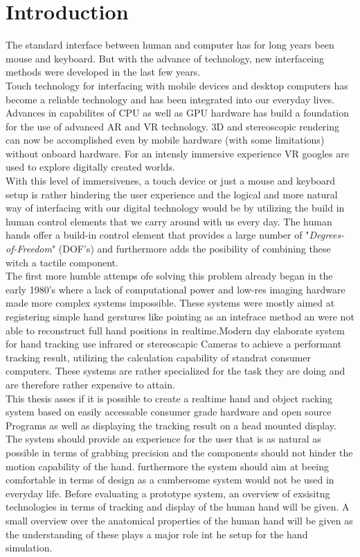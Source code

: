 \chapter{Introduction}
The standard interface between human and computer has for long years been mouse and keyboard. But with the advance of technology, new interfaceing methods were developed in the last few years.\\
Touch technology for interfacing with mobile devices and desktop computers has become a reliable technology and has been integrated into our everyday lives.
Advances in capabilites of CPU as well as GPU hardware has build a foundation for the use of advanced AR and VR technology. 3D and stereoscopic rendering can now be accomplished even by mobile hardware (with some limitations) without onboard hardware. For an intensly immersive experience VR googles are used to explore digitally created worlds.\\
With this level of immersivenes, a touch device or just a mouse and keyboard setup is rather hindering the user experience and the logical and more natural way of interfacing with our digital technology would be by utilizing the build in human control elements that we carry around with us every day. The human hands offer a build-in control element that provides a large number of "\textit{Degrees-of-Freedom}" (DOF's) and furthermore adds the posibility of combining these witch a tactile component.\\The first more humble attemps ofe solving this problem already began in the early 1980's where a lack of computational power and low-res imaging hardware made more complex systems impossible. These systems were mostly aimed at registering simple hand gerstures like pointing as an intefrace method an were not able to reconstruct full hand positions in realtime\cite{Bolt.1980}.Modern day elaborate system for hand tracking use infrared or stereoscapic Cameras to achieve a performant tracking result, utilizing the calculation capability of standrat consumer computers. These systems are rather specialized for the task they are doing and are therefore rather expensive to attain. \\
This thesis asses if it is possible to create a realtime hand and object racking system based on easily accessable consumer grade hardware and open source Programs as well as displaying the tracking result on a head mounted display. The system should provide an experience for the user that is as natural as possible in terms of grabbing precision and  the components should not hinder the motion capability of the hand. furthermore the system should aim at beeing comfortable in terms of design as a cumbersome system would not be used  in everyday life.
Before evaluating a prototype system, an overview of exsisitng technologies in terms of tracking and display of the human hand will be given. A small overview over the anatomical properties of the human hand will be given as the understanding of these plays a major role int he setup for the hand simulation.


